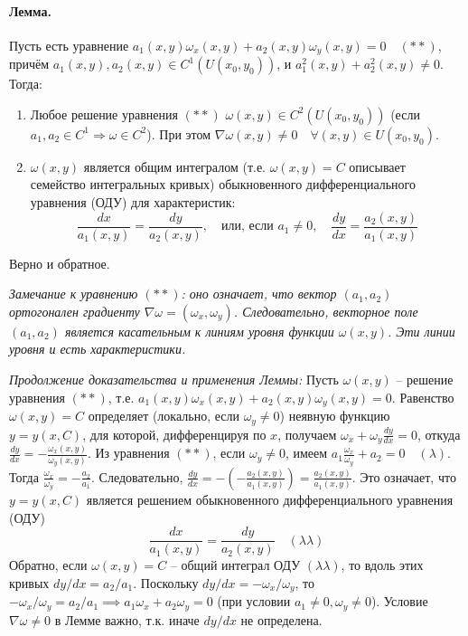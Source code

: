 \documentclass[12pt, a4paper]{article}
\begin{document}
\paragraph{Лемма.}
Пусть есть уравнение $a_1(x,y)\omega_x(x,y) + a_2(x,y)\omega_y(x,y) = 0 \quad (**)$, причём $a_1(x,y), a_2(x,y) \in C^1(U(x_0,y_0))$, и $a_1^2(x,y) + a_2^2(x,y) \neq 0$.
\newline Тогда:
\begin{enumerate}
    \item Любое решение уравнения $(**)$ $\omega(x,y) \in C^2(U(x_0,y_0))$ (если $a_1, a_2 \in C^1 \Rightarrow \omega \in C^2$).
    При этом $\nabla \omega(x,y) \neq 0 \quad \forall (x,y) \in U(x_0,y_0)$.
    \item $\omega(x,y)$ является общим интегралом (т.е. $\omega(x,y)=C$ описывает семейство интегральных кривых) обыкновенного дифференциального уравнения (ОДУ) для характеристик:
    \[ \frac{dx}{a_1(x,y)} = \frac{dy}{a_2(x,y)}, \quad \text{или, если } a_1 \neq 0, \quad \frac{dy}{dx} = \frac{a_2(x,y)}{a_1(x,y)} \]
\end{enumerate}
Верно и обратное.

\textit{Замечание к уравнению $(**)$: оно означает, что вектор $(a_1, a_2)$ ортогонален градиенту $\nabla \omega = (\omega_x, \omega_y)$. Следовательно, векторное поле $(a_1, a_2)$ является касательным к линиям уровня функции $\omega(x,y)$. Эти линии уровня и есть характеристики.}


\textit{Продолжение доказательства и применения Леммы:}
\newline
Пусть $\omega(x,y)$ -- решение уравнения $(**)$, т.е. $a_1(x,y)\omega_x(x,y) + a_2(x,y)\omega_y(x,y) = 0$.
Равенство $\omega(x,y)=C$ определяет (локально, если $\omega_y \neq 0$) неявную функцию $y=y(x,C)$, для которой, дифференцируя по $x$, получаем $\omega_x + \omega_y \frac{dy}{dx} = 0$, откуда $\frac{dy}{dx} = -\frac{\omega_x(x,y)}{\omega_y(x,y)}$.
Из уравнения $(**)$, если $\omega_y \neq 0$, имеем $a_1 \frac{\omega_x}{\omega_y} + a_2 = 0 \quad (\lambda)$.
Тогда $\frac{\omega_x}{\omega_y} = -\frac{a_2}{a_1}$.
Следовательно, $\frac{dy}{dx} = - \left(-\frac{a_2(x,y)}{a_1(x,y)}\right) = \frac{a_2(x,y)}{a_1(x,y)}$.
Это означает, что $y=y(x,C)$ является решением обыкновенного дифференциального уравнения (ОДУ)
\[ \frac{dx}{a_1(x,y)} = \frac{dy}{a_2(x,y)} \quad (\lambda\lambda) \]
Обратно, если $\omega(x,y)=C$ -- общий интеграл ОДУ $(\lambda\lambda)$, то вдоль этих кривых $dy/dx = a_2/a_1$.
Поскольку $dy/dx = -\omega_x/\omega_y$, то $-\omega_x/\omega_y = a_2/a_1 \implies a_1\omega_x + a_2\omega_y = 0$ (при условии $a_1 \neq 0, \omega_y \neq 0$).
Условие $\nabla \omega \neq 0$ в Лемме важно, т.к. иначе $dy/dx$ не определена.
\end{document}
